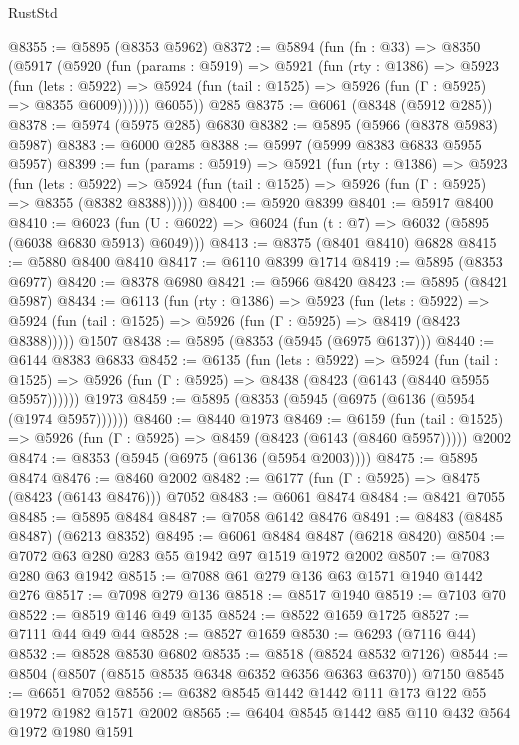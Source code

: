 \begin{lexlean}{RustStd}
\begin{coremodule}
{{@8355 := @5895 (@8353 @5962)
@8372 := @5894
    (fun (fn : @33) =>
    @8350
      (@5917
        (@5920
          (fun (params : @5919) =>
          @5921
            (fun (rty : @1386) =>
            @5923
              (fun (lets : @5922) =>
              @5924 (fun (tail : @1525) => @5926 (fun (Γ : @5925) => @8355 @6009))))))
        @6055))
    @285
@8375 := @6061 (@8348 (@5912 @285))
@8378 := @5974 (@5975 @285) @6830
@8382 := @5895 (@5966 (@8378 @5983) @5987)
@8383 := @6000 @285
@8388 := @5997 (@5999 @8383 @6833 @5955 @5957)
@8399 := fun (params : @5919) =>
  @5921
    (fun (rty : @1386) =>
    @5923
      (fun (lets : @5922) =>
      @5924 (fun (tail : @1525) => @5926 (fun (Γ : @5925) => @8355 (@8382 @8388)))))
@8400 := @5920 @8399
@8401 := @5917 @8400
@8410 := @6023 (fun (U : @6022) => @6024 (fun (t : @7) => @6032 (@5895 (@6038 @6830 @5913) @6049)))
@8413 := @8375 (@8401 @8410) @6828
@8415 := @5880 @8400 @8410
@8417 := @6110 @8399 @1714
@8419 := @5895 (@8353 @6977)
@8420 := @8378 @6980
@8421 := @5966 @8420
@8423 := @5895 (@8421 @5987)
@8434 := @6113
    (fun (rty : @1386) =>
    @5923
      (fun (lets : @5922) =>
      @5924 (fun (tail : @1525) => @5926 (fun (Γ : @5925) => @8419 (@8423 @8388)))))
    @1507
@8438 := @5895 (@8353 (@5945 (@6975 @6137)))
@8440 := @6144 @8383 @6833
@8452 := @6135
    (fun (lets : @5922) =>
    @5924
      (fun (tail : @1525) => @5926 (fun (Γ : @5925) => @8438 (@8423 (@6143 (@8440 @5955 @5957))))))
    @1973
@8459 := @5895 (@8353 (@5945 (@6975 (@6136 (@5954 (@1974 @5957))))))
@8460 := @8440 @1973
@8469 := @6159
    (fun (tail : @1525) => @5926 (fun (Γ : @5925) => @8459 (@8423 (@6143 (@8460 @5957)))))
    @2002
@8474 := @8353 (@5945 (@6975 (@6136 (@5954 @2003))))
@8475 := @5895 @8474
@8476 := @8460 @2002
@8482 := @6177 (fun (Γ : @5925) => @8475 (@8423 (@6143 @8476))) @7052
@8483 := @6061 @8474
@8484 := @8421 @7055
@8485 := @5895 @8484
@8487 := @7058 @6142 @8476
@8491 := @8483 (@8485 @8487) (@6213 @8352)
@8495 := @6061 @8484 @8487 (@6218 @8420)
@8504 := @7072 @63 @280 @283 @55 @1942 @97 @1519 @1972 @2002
@8507 := @7083 @280 @63 @1942
@8515 := @7088 @61 @279 @136 @63 @1571 @1940 @1442 @276
@8517 := @7098 @279 @136
@8518 := @8517 @1940
@8519 := @7103 @70
@8522 := @8519 @146 @49 @135
@8524 := @8522 @1659 @1725
@8527 := @7111 @44 @49 @44
@8528 := @8527 @1659
@8530 := @6293 (@7116 @44)
@8532 := @8528 @8530 @6802
@8535 := @8518 (@8524 @8532 @7126)
@8544 := @8504 (@8507 (@8515 @8535 @6348 @6352 @6356 @6363 @6370)) @7150
@8545 := @6651 @7052
@8556 := @6382 @8545 @1442 @1442 @111 @173 @122 @55 @1972 @1982 @1571 @2002
@8565 := @6404 @8545 @1442 @85 @110 @432 @564 @1972 @1980 @1591
}}
\end{coremodule}
\end{lexlean}
